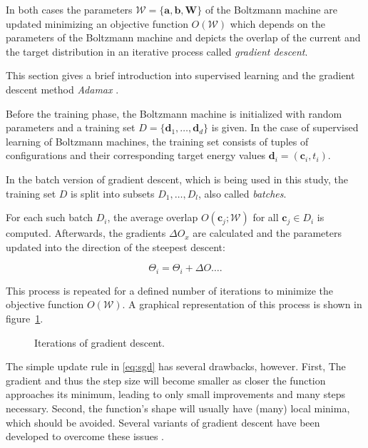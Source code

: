 In both cases the parameters $\mathcal{W} = \{\bm{a},\bm{b},\bm{W}\}$ of the Boltzmann machine are updated minimizing 
an objective function $O(\mathcal{W})$ which depends on the parameters of the Boltzmann machine and 
depicts the overlap of the current and the target distribution in an iterative process called 
\textit{gradient descent}.

This section gives a brief introduction into supervised learning and the gradient descent method \textit{Adamax} \cite{kingma2014adam}.

Before the training phase, the Boltzmann machine is initialized with random parameters and a training set 
$D=\{\bm{d}_1,\dots,\bm{d}_d\}$ is given. In the case of supervised learning of Boltzmann machines, the training set consists of tuples of configurations and their corresponding target energy values $\bm{d}_i= (\bm{c}_i, t_i)$.

In the batch version of gradient descent, which is being used in this study, the training set $D$ is 
split into subsets $D_1, \dots, D_l$, also called \textit{batches}.

For each such batch $D_i$, the average overlap $O(\bm{c}_j; \mathcal{W})$ for all $\bm{c}_j \in D_i$
is computed. Afterwards, the gradients $\Delta O_{x}$ are calculated and the parameters updated into
the direction of the steepest descent:

\begin{equation}
    \label{eq:sgd}
    \Theta_i = \Theta_i + \Delta O \dots.
\end{equation}

This process is repeated for a defined number of iterations to minimize the objective function $O(\mathcal{W})$.
A graphical representation of this process is shown in figure~\ref{fig:sgd}.

\begin{figure}[H]
    \label{fig:sgd}
    \centering
    \caption{Iterations of gradient descent.} 
\end{figure}

The simple update rule in \ref{eq:sgd} has several drawbacks, however. First, The gradient and thus the step size will become smaller as closer the function approaches its minimum, leading to only small improvements and many steps necessary.
Second, the function's shape will usually have (many) local minima, which should be avoided.
Several variants of gradient descent have been developed to overcome these issues \cite{ruder2016overview}.

